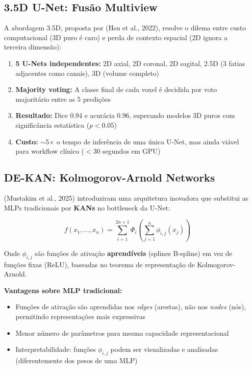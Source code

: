 \subsection{3.5D U-Net: Fusão Multiview}

A abordagem 3.5D, proposta por  (Hsu et al., 2022), resolve
o dilema entre custo computacional (3D puro é caro) e perda de contexto espacial
(2D ignora a terceira dimensão):

\begin{enumerate}
  \item \textbf{5 U-Nets independentes:} 2D axial, 2D coronal, 2D sagital,
        2.5D (3 fatias adjacentes como canais), 3D (volume completo)
  \item \textbf{Majority voting:} A classe final de cada voxel é decidida por
        voto majoritário entre as 5 predições
  \item \textbf{Resultado:} Dice 0.94 e acurácia 0.96, superando modelos 3D
        puros com significância estatística ($p < 0.05$)
  \item \textbf{Custo:} $\sim$5$\times$ o tempo de inferência de uma única
        U-Net, mas ainda viável para workflow clínico ($< 30$ segundos em GPU)
\end{enumerate}

\subsection{DE-KAN: Kolmogorov-Arnold Networks}

 (Mustakim et al., 2025) introduziram uma arquitetura
inovadora que substitui as MLPs tradicionais por \textbf{KANs} no bottleneck
da U-Net:

\begin{equation}
  f(x_1, \ldots, x_n) = \sum_{i=1}^{2n+1} \Phi_i\left(\sum_{j=1}^{n} \phi_{i,j}(x_j)\right)
  \label{eq:kan}
\end{equation}

Onde $\phi_{i,j}$ são funções de ativação \textbf{aprendíveis} (splines B-spline)
em vez de funções fixas (ReLU), baseadas no teorema de representação de
Kolmogorov-Arnold.

\textbf{Vantagens sobre MLP tradicional:}
\begin{itemize}
  \item Funções de ativação são aprendidas nos \textit{edges} (arestas), não nos
        \textit{nodes} (nós), permitindo representações mais expressivas
  \item Menor número de parâmetros para mesma capacidade representacional
  \item Interpretabilidade: funções $\phi_{i,j}$ podem ser visualizadas e
        analisadas (diferentemente dos pesos de uma MLP)
\end{itemize}

